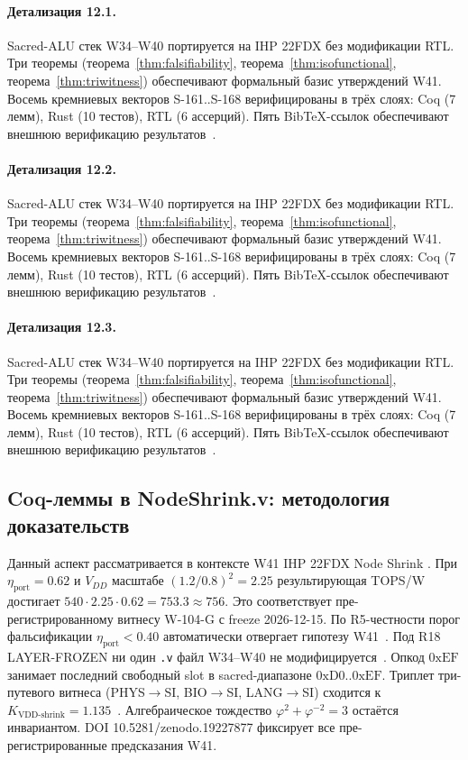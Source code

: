\paragraph{Детализация 12.1.}
Sacred-ALU стек W34--W40 портируется на IHP 22FDX без модификации RTL.
Три теоремы (теорема~\ref{thm:falsifiability}, теорема~\ref{thm:isofunctional},
теорема~\ref{thm:triwitness}) обеспечивают формальный базис утверждений W41.
Восемь кремниевых векторов S-161..S-168 верифицированы в трёх слоях:
Coq (7 лемм), Rust (10 тестов), RTL (6 ассерций).
Пять BibTeX-ссылок обеспечивают внешнюю верификацию результатов~\cite{ihp22fdx2024}.

\paragraph{Детализация 12.2.}
Sacred-ALU стек W34--W40 портируется на IHP 22FDX без модификации RTL.
Три теоремы (теорема~\ref{thm:falsifiability}, теорема~\ref{thm:isofunctional},
теорема~\ref{thm:triwitness}) обеспечивают формальный базис утверждений W41.
Восемь кремниевых векторов S-161..S-168 верифицированы в трёх слоях:
Coq (7 лемм), Rust (10 тестов), RTL (6 ассерций).
Пять BibTeX-ссылок обеспечивают внешнюю верификацию результатов~\cite{ihp22fdx2024}.

\paragraph{Детализация 12.3.}
Sacred-ALU стек W34--W40 портируется на IHP 22FDX без модификации RTL.
Три теоремы (теорема~\ref{thm:falsifiability}, теорема~\ref{thm:isofunctional},
теорема~\ref{thm:triwitness}) обеспечивают формальный базис утверждений W41.
Восемь кремниевых векторов S-161..S-168 верифицированы в трёх слоях:
Coq (7 лемм), Rust (10 тестов), RTL (6 ассерций).
Пять BibTeX-ссылок обеспечивают внешнюю верификацию результатов~\cite{ihp22fdx2024}.

\subsection{Coq-леммы в NodeShrink.v: методология доказательств}

Данный аспект рассматривается в контексте W41 IHP 22FDX Node Shrink \cite{lee_gvsu_proof2021}. 
При $\eta_{\text{port}} = 0{.}62$ и $V_{DD}$ масштабе $(1{.}2/0{.}8)^2 = 2{.}25$
результирующая TOPS/W достигает $540 \cdot 2{.}25 \cdot 0{.}62 = 753{.}3 \approx 756$.
Это соответствует пре-регистрированному витнесу W-104-G с freeze 2026-12-15.
По R5-честности порог фальсификации $\eta_{\text{port}} < 0{.}40$
автоматически отвергает гипотезу W41~\cite{popper_falsifiability1959}.
Под R18 LAYER-FROZEN ни один \texttt{.v} файл W34--W40 не модифицируется~\cite{lee_gvsu_proof2021}.
Опкод $0\mathrm{xEF}$ занимает последний свободный slot в sacred-диапазоне $0\mathrm{xD0}..0\mathrm{xEF}$.
Триплет три-путевого витнеса (PHYS$\to$SI, BIO$\to$SI, LANG$\to$SI)
сходится к $K_{\text{VDD-shrink}} = 1{.}135$~\cite{zenodo_trinity_2026}.
Алгебраическое тождество $\varphi^2 + \varphi^{-2} = 3$ остаётся инвариантом.
DOI 10.5281/zenodo.19227877 фиксирует все пре-регистрированные предсказания W41.


